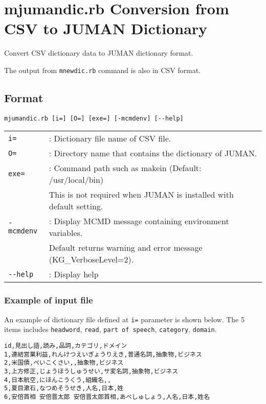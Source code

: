 



\section{mjumandic.rb Conversion from CSV to JUMAN Dictionary \label{sect:mjumandic}}

Convert CSV dictionary data to JUMAN dictionary format.  

The output from \verb|mnewdic.rb| command is also in CSV format. 


\subsection{Format}
\begin{verbatim}
mjumandic.rb [i=] [O=] [exe=] [-mcmdenv] [--help]
\end{verbatim}

\begin{table}[htbp]
{\small
\begin{tabular}{ll}
\verb|i=|       & :  Dictionary file name of CSV file.   \\
\verb|O=|       & :  Directory name that contains the dictionary of JUMAN. \\
\verb|exe=|     & :  Command path such as makein (Default:  /usr/local/bin) \\
                &    This is not required when JUMAN is installed with default setting.   \\
\verb|-mcmdenv| & :  Display MCMD message containing environment variables.  \\
                &    Default returns warning and error message  (KG\_VerboseLevel=2).  \\
\verb|--help|   & : Display help \\
\end{tabular} 
}
\end{table} 

\subsubsection*{Example of input file}

An example of dictionary file defined at  \verb|i=| parameter is shown below. 
The 5 items includes \verb|headword|, \verb|read|, \verb|part of speech|, \verb|category|, \verb|domain|. 

\begin{Verbatim}[baselinestretch=0.7,frame=single]
id,見出し語,読み,品詞,カテゴリ,ドメイン
1,連結営業利益,れんけつえいぎょうりえき,普通名詞,抽象物,ビジネス
2,米国債,べいこくさい,,抽象物,ビジネス
3,上方修正,じょうほうしゅうせい,サ変名詞,抽象物,ビジネス
4,日本航空,にほんこうくう,組織名,,
5,夏目漱石,なつめそうせき,人名,日本,姓
6,安倍首相 安倍晋太郎 安倍晋太郎首相,あべしゅしょう,人名,日本,姓名
\end{Verbatim}

